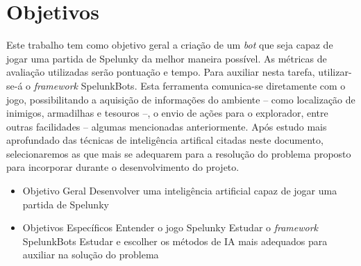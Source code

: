 \chapter{\label{chap:objectives}Objetivos}
Este trabalho tem como objetivo geral a criação de um \textit{bot} que seja
capaz de jogar uma partida de Spelunky da melhor maneira possível. As métricas
de avaliação utilizadas serão pontuação e tempo. Para auxiliar nesta tarefa,
utilizar-se-á o \textit{framework} SpelunkBots. Esta ferramenta comunica-se
diretamente com o jogo, possibilitando a aquisição de informações do ambiente -- como localização de inimigos, armadilhas e tesouros --, o envio de ações para o explorador, entre outras facilidades -- algumas mencionadas anteriormente. Após estudo mais aprofundado das técnicas de inteligência artifical citadas neste documento, selecionaremos as que mais se adequarem para a resolução do problema proposto para incorporar durante o desenvolvimento do projeto.


\begin{itemize}
    \item Objetivo Geral
        \subitem Desenvolver uma inteligência artificial capaz de jogar uma partida de Spelunky
    \item Objetivos Específicos
        \subitem Entender o jogo Spelunky
        \subitem Estudar o \textit{framework} SpelunkBots
        \subitem Estudar e escolher os métodos de IA mais adequados para auxiliar na solução do problema
\end{itemize}
